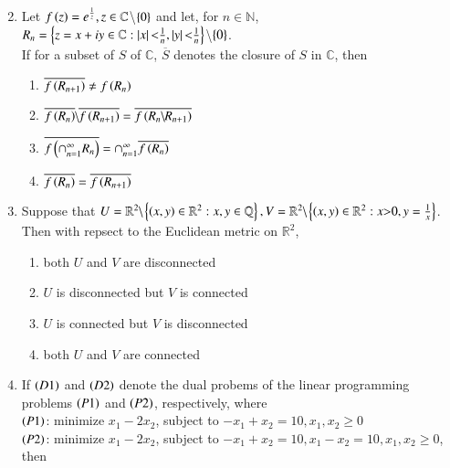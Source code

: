 \documentclass[journal]{IEEEtran}
\begin{document}
\begin{enumerate}
{\begin{multicols}{2}
\begin{enumerate}
\end{enumerate}
\end{multicols}}
\item{
Let $f\left(z\right)=e^{\frac{1}{z}},z\in\mathbb{C}$\textbackslash$\left\{0\right\}$ and let, for $n\in\mathbb{N}$,\\
$R_n=\left\{z=x+iy\in\mathbb{C}:\left\vert x\right\vert\text{\textless}\frac{1}{n},\left\vert y\right\vert\text{\textless}\frac{1}{n}\right\}$\textbackslash$\left\{0\right\}$.\\
If for a subset of $S$ of $\mathbb{C}$, $\overline{S}$ denotes the closure of $S$ in $\mathbb{C}$, then
\begin{multicols}{2}
\begin{enumerate}
\item $\overline{f\left(R_{n+1}\right)}\neq f\left(R_n\right)$
\item $\overline{f\left(R_n\right)}\text{\textbackslash}\overline{f\left(R_{n+1}\right)}=\overline{f\left(R_n\text{\textbackslash}R_{n+1}\right)}$
\item $\overline{f\left(\cap_{n=1}^{\infty}R_n\right)}=\cap_{n=1}^{\infty}\overline{f\left(R_n\right)}$
\item $\overline{f\left(R_n\right)}=\overline{f\left(R_{n+1}\right)}$
\end{enumerate}
\end{multicols}
}
\item{
Suppose that $U=\mathbb{R}^2\text{\textbackslash}\left\{\left(x,y\right)\in\mathbb{R}^2:x,y\in\mathbb{Q}\right\},V=\mathbb{R}^2\text{\textbackslash}\left\{\left(x,y\right)\in\mathbb{R}^2:x\text{\textgreater}0,y=\frac{1}{x}\right\}$. Then with repsect to the Euclidean metric on $\mathbb{R}^2$,
\begin{multicols}{2} 
\begin{enumerate}
\item both $U$ and $V$ are disconnected
\item $U$ is disconnected but $V$ is connected
\item $U$ is connected but $V$ is disconnected 
\item both $U$ and $V$ are connected 
\end{enumerate}
\end{multicols}
}
\item{
If $\left(D1\right)$ and $\left(D2\right)$ denote the dual probems of the linear programming problems $\left(P1\right)$ and $\left(P2\right)$, respectively, where\\
$\left(P1\right)$: minimize $x_1-2x_2$, subject to $-x_1+x_2=10,x_1,x_2\geq 0$\\
$\left(P2\right)$: minimize $x_1-2x_2$, subject to $-x_1+x_2=10,x_1-x_2=10,x_1,x_2\geq 0$, then
}
\end{enumerate}
\end{document}
